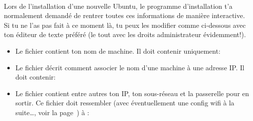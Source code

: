 \paragraph{}
\label{Ubuntu:IP}

Lors de l'installation d'une nouvelle Ubuntu, le programme d'installation t'a normalement demand\'e de rentrer toutes ces informations de mani\`ere
interactive. Si tu ne l'as pas fait \`a ce moment l\`a, tu peux les modifier comme ci-dessous avec ton \'editeur de texte pr\'ef\'er\'e (le tout avec les droits
administrateur \'evidemment!).

\begin{itemize}
\item Le fichier  contient ton nom de machine. Il doit contenir uniquement:


\item Le fichier  d\'ecrit comment associer le nom d'une machine \`a une adresse IP.
Il doit contenir:


\item Le fichier  contient entre autres ton IP,
ton sous-r\'eseau et la passerelle pour en sortir. Ce fichier doit
ressembler (avec \'eventuellement une config wifi \`a la suite\ldots,
voir la page~\pageref{wifi}) \`a :


\end{itemize}

